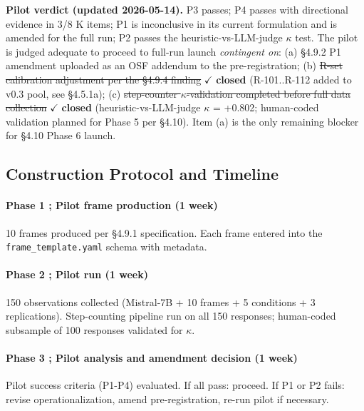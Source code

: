 \documentclass{article}
\providecommand{\st}[1]{\sout{#1}}     %
\begin{document}
\textbf{Pilot verdict (updated 2026-05-14).} P3 passes; P4 passes with
directional evidence in 3/8 K items; P1 is inconclusive in its current
formulation and is amended for the full run; P2 passes the
heuristic-vs-LLM-judge \ensuremath{\kappa} test. The pilot is judged adequate to proceed
to full-run launch \emph{contingent on}: (a) \S{}4.9.2 P1 amendment
uploaded as an OSF addendum to the pre-registration; (b) \st{R-set
calibration adjustment per the \S{}4.9.4 finding} \ensuremath{\checkmark} \textbf{closed}
(R-101..R-112 added to v0.3 pool, see \S{}4.5.1a); (c) \st{step-counter
\ensuremath{\kappa}-validation completed before full data collection} \ensuremath{\checkmark} \textbf{closed}
(heuristic-vs-LLM-judge \ensuremath{\kappa} = +0.802; human-coded validation planned for
Phase 5 per \S{}4.10). Item (a) is the only remaining blocker for \S{}4.10
Phase 6 launch.

\subsection{Construction Protocol and
Timeline}\label{construction-protocol-and-timeline}

\paragraph{Phase 1 ; Pilot frame production (1
week)}\label{phase-1-pilot-frame-production-1-week}

10 frames produced per \S{}4.9.1 specification. Each frame entered into the
\texttt{frame\_\textasciigrave{}\textasciigrave{}template.yaml} schema
with metadata.

\paragraph{Phase 2 ; Pilot run (1 week)}\label{phase-2-pilot-run-1-week}

150 observations collected (Mistral-7B + 10 frames + 5 conditions + 3
replications). Step-counting pipeline run on all 150 responses;
human-coded subsample of 100 responses validated for \ensuremath{\kappa}.

\paragraph{Phase 3 ; Pilot analysis and amendment decision (1
week)}\label{phase-3-pilot-analysis-and-amendment-decision-1-week}

Pilot success criteria (P1-P4) evaluated. If all pass: proceed. If P1 or
P2 fails: revise operationalization, amend pre-registration, re-run
pilot if necessary.
\end{document}
